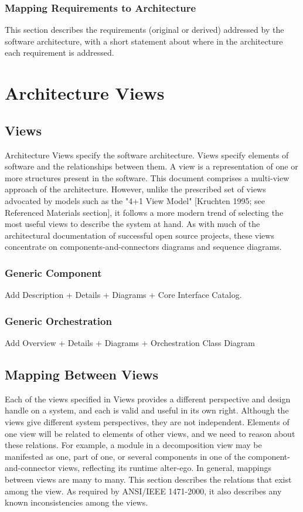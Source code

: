 \documentclass[a4paper,11pt]{book}
\begin{document}
\subsection{Mapping Requirements to Architecture}
This section describes the requirements (original or derived) addressed by the software architecture, with a short statement about where in the architecture each requirement is addressed.

\chapter{Architecture Views}

\section{Views}
Architecture Views specify the software architecture. Views specify elements of software and the relationships between them. A view is a representation of one or more structures present in the software. This document comprises a multi-view approach of the architecture. However, unlike the prescribed set of views advocated by models such as the "4+1 View Model" [Kruchten 1995; see Referenced Materials section], it follows a more modern trend of selecting the most useful views to describe the system at hand. As with much of the architectural documentation of successful open source projects, these views concentrate on components-and-connectors diagrams and sequence diagrams.

\subsection{Generic Component}
Add Description + Details + Diagrams + Core Interface Catalog.

\subsection{Generic Orchestration}
Add Overview + Details + Diagrams + Orchestration Class Diagram

\section{Mapping Between Views}
Each of the views specified in Views provides a different perspective and design handle on a system, and each is valid and useful in its own right. Although the views give different system perspectives, they are not independent. Elements of one view will be related to elements of other views, and we need to reason about these relations. For example, a module in a decomposition view may be manifested as one, part of one, or several components in one of the component-and-connector views, reflecting its runtime alter-ego. In general, mappings between views are many to many. This section describes the relations that exist among the view. As required by ANSI/IEEE 1471-2000, it also describes any known inconsistencies among the views.
\end{document}
